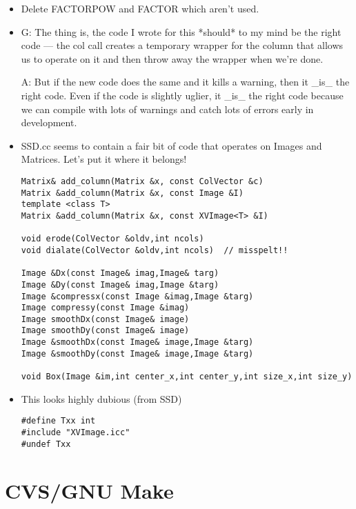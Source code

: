 \begin{itemize}
\item
Delete FACTORPOW and FACTOR which aren't used.

\item
G:
  The thing is, the code I wrote for this *should* to my mind be the
  right code --- the col call creates a temporary wrapper for the column
  that allows us to operate on it and then throw away the wrapper when
  we're done. 

A:
  But if the new code does the same and it kills a warning, then it \_is\_ the
  right code.  Even if the code is slightly uglier, it \_is\_ the right code
  because we can compile with lots of warnings and catch lots of errors
  early in development.

\item
SSD.cc seems to contain a fair bit of code that operates on
Images and Matrices.  Let's put it where it belongs!
\begin{verbatim}
Matrix& add_column(Matrix &x, const ColVector &c)
Matrix &add_column(Matrix &x, const Image &I)
template <class T>
Matrix &add_column(Matrix &x, const XVImage<T> &I)

void erode(ColVector &oldv,int ncols)
void dialate(ColVector &oldv,int ncols)  // misspelt!!

Image &Dx(const Image& imag,Image& targ)
Image &Dy(const Image& imag,Image &targ)
Image &compressx(const Image &imag,Image &targ)
Image compressy(const Image &imag)
Image smoothDx(const Image& image)
Image smoothDy(const Image& image)
Image &smoothDx(const Image& image,Image &targ)
Image &smoothDy(const Image& image,Image &targ)

void Box(Image &im,int center_x,int center_y,int size_x,int size_y)
\end{verbatim}

\item
This looks highly dubious (from SSD)
\begin{verbatim}
#define Txx int
#include "XVImage.icc"
#undef Txx
\end{verbatim}

\end{itemize}


\section{CVS/GNU Make}

